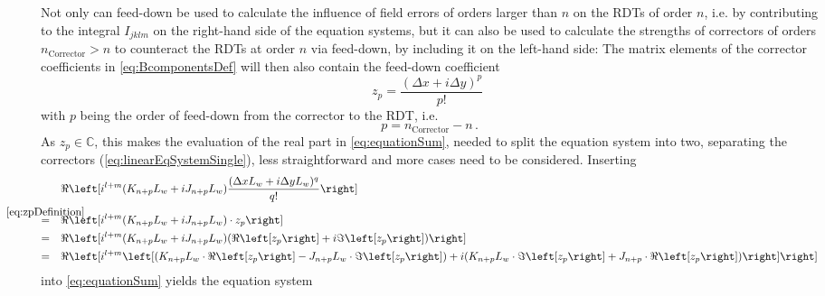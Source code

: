Not only can feed-down be used to calculate the influence of field errors of orders larger than $n$ on the RDTs of order $n$, 
i.e. by contributing to the integral $I_{jklm}$ on the right-hand side of the equation systems, 
but it can also be used to calculate the strengths of correctors of orders $n_\text{Corrector} > n$ 
to counteract the RDTs at order $n$ via feed-down, by including it on the left-hand side:
The matrix elements of the corrector coefficients in \cref{eq:BcomponentsDef} will then also contain the feed-down coefficient
%
\begin{equation}
    \label{eq:zpDefinition}
    z_{p} = \frac{\left( \Delta x + i\Delta y\right)^p}{p!} \, \,
\end{equation}
%
with $p$ being the order of feed-down from the corrector to the RDT, i.e. 
\begin{equation}
    \label{eq:DiffOrderCorrectorRDT}
    p = n_\text{Corrector} - n \, .
\end{equation}
%
As $z_p \in \mathbb{C}$, this makes the evaluation of the real part in \cref{eq:equationSum}, 
needed to split the equation system into two, separating the correctors (\cref{eq:linearEqSystemSingle}), 
less straightforward and more cases need to be considered.
Inserting
%
\begin{equation}
    \label{eq:KnJnWithZp}
    \begin{split}
        &\ReOf{    
        i^{l+m}
        (K_{n+p}L_w + iJ_{n+p}L_w) \frac{(\Delta xL_w + i \Delta yL_w)^q}{q!} 
        }
        \\
        \overeq{\cref{eq:zpDefinition}} \quad
        &\ReOf{    
        i^{l+m}
        (K_{n+p}L_w + iJ_{n+p}L_w) \cdot z_p 
        }
        \\
        =  \quad
        &\ReOf{    
        i^{l+m}
        (K_{n+p}L_w + iJ_{n+p}L_w) (\ReOf{z_p} + i\ImOf{z_p}) 
        }
        \\
        =  \quad
        &\ReOf{    
        i^{l+m} \left[
        (K_{n+p}L_w \cdot \ReOf{z_p} -J_{n+p}L_w \cdot \ImOf{z_p}) + i(K_{n+p}L_w \cdot \ImOf{z_p} + J_{n+p} \cdot \ReOf{z_p} )\right] 
        }
    \end{split}
\end{equation}
%
into \cref{eq:equationSum} yields the equation system
%

